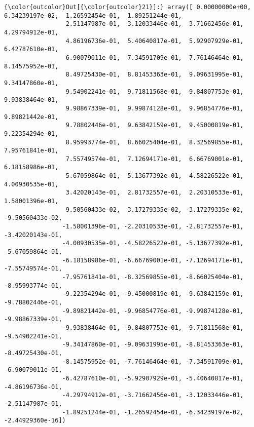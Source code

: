 \documentclass[11pt]{article}
\begin{document}
\begin{Verbatim}[commandchars=\\\{\}]
{\color{outcolor}Out[{\color{outcolor}21}]:} array([ 0.00000000e+00,  6.34239197e-02,  1.26592454e-01,  1.89251244e-01,
                 2.51147987e-01,  3.12033446e-01,  3.71662456e-01,  4.29794912e-01,
                 4.86196736e-01,  5.40640817e-01,  5.92907929e-01,  6.42787610e-01,
                 6.90079011e-01,  7.34591709e-01,  7.76146464e-01,  8.14575952e-01,
                 8.49725430e-01,  8.81453363e-01,  9.09631995e-01,  9.34147860e-01,
                 9.54902241e-01,  9.71811568e-01,  9.84807753e-01,  9.93838464e-01,
                 9.98867339e-01,  9.99874128e-01,  9.96854776e-01,  9.89821442e-01,
                 9.78802446e-01,  9.63842159e-01,  9.45000819e-01,  9.22354294e-01,
                 8.95993774e-01,  8.66025404e-01,  8.32569855e-01,  7.95761841e-01,
                 7.55749574e-01,  7.12694171e-01,  6.66769001e-01,  6.18158986e-01,
                 5.67059864e-01,  5.13677392e-01,  4.58226522e-01,  4.00930535e-01,
                 3.42020143e-01,  2.81732557e-01,  2.20310533e-01,  1.58001396e-01,
                 9.50560433e-02,  3.17279335e-02, -3.17279335e-02, -9.50560433e-02,
                -1.58001396e-01, -2.20310533e-01, -2.81732557e-01, -3.42020143e-01,
                -4.00930535e-01, -4.58226522e-01, -5.13677392e-01, -5.67059864e-01,
                -6.18158986e-01, -6.66769001e-01, -7.12694171e-01, -7.55749574e-01,
                -7.95761841e-01, -8.32569855e-01, -8.66025404e-01, -8.95993774e-01,
                -9.22354294e-01, -9.45000819e-01, -9.63842159e-01, -9.78802446e-01,
                -9.89821442e-01, -9.96854776e-01, -9.99874128e-01, -9.98867339e-01,
                -9.93838464e-01, -9.84807753e-01, -9.71811568e-01, -9.54902241e-01,
                -9.34147860e-01, -9.09631995e-01, -8.81453363e-01, -8.49725430e-01,
                -8.14575952e-01, -7.76146464e-01, -7.34591709e-01, -6.90079011e-01,
                -6.42787610e-01, -5.92907929e-01, -5.40640817e-01, -4.86196736e-01,
                -4.29794912e-01, -3.71662456e-01, -3.12033446e-01, -2.51147987e-01,
                -1.89251244e-01, -1.26592454e-01, -6.34239197e-02, -2.44929360e-16])
\end{Verbatim}
            
\end{document}
